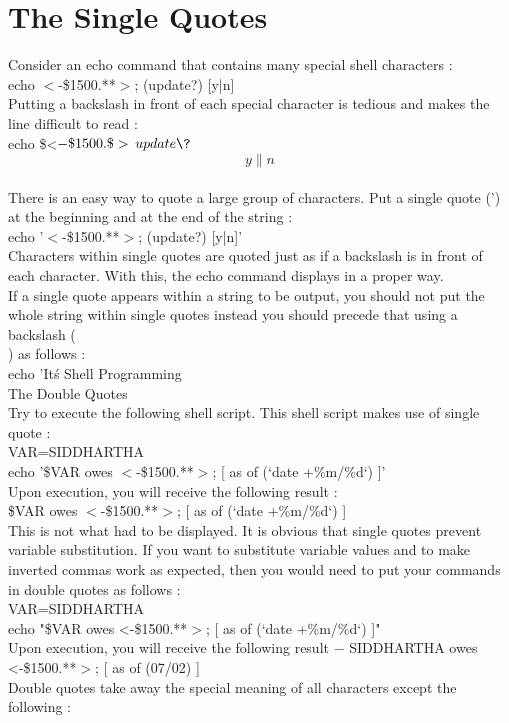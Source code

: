 \documentclass{article}
\begin{document}
\section*{The Single Quotes}
Consider an echo command that contains many special shell characters :\\
echo $<$-\$1500.**$>$; (update?) [y|n]\\
Putting a backslash in front of each special character is tedious and makes the line difficult to read :\\
echo \$<$-\$1500.\*\*\$>$\; \(update\?\) \[y\|n\]\\
There is an easy way to quote a large group of characters. Put a single quote (') at the beginning and at the end of the string :\\
echo '$<$-\$1500.**$>$; (update?) [y|n]'\\
Characters within single quotes are quoted just as if a backslash is in front of each character. With this, the echo command displays in a proper way.\\
If a single quote appears within a string to be output, you should not put the whole string within single quotes instead you should precede that using a backslash (\\) as follows :\\
echo 'It\'s Shell Programming\\
The Double Quotes\\
Try to execute the following shell script. This shell script makes use of single quote :\\
VAR=SIDDHARTHA\\
echo '\$VAR owes $<$-\$1500.**$>$; [ as of (`date +\%m/\%d`) ]'\\
Upon execution, you will receive the following result :\\
\$VAR owes $<$-\$1500.**$>$; [ as of (`date +\%m/\%d`) ]\\
This is not what had to be displayed. It is obvious that single quotes prevent variable substitution. If you want to substitute variable values and to make inverted commas work as expected, then you would need to put your commands in double quotes as follows :\\
VAR=SIDDHARTHA\\
echo "\$VAR owes <-\$1500.**$>$; [ as of (`date +\%m/\%d`) ]"\\
Upon execution, you will receive the following result −
SIDDHARTHA owes <-\$1500.**$>$; [ as of (07/02) ]\\
Double quotes take away the special meaning of all characters except the following :\\
\end{document}
